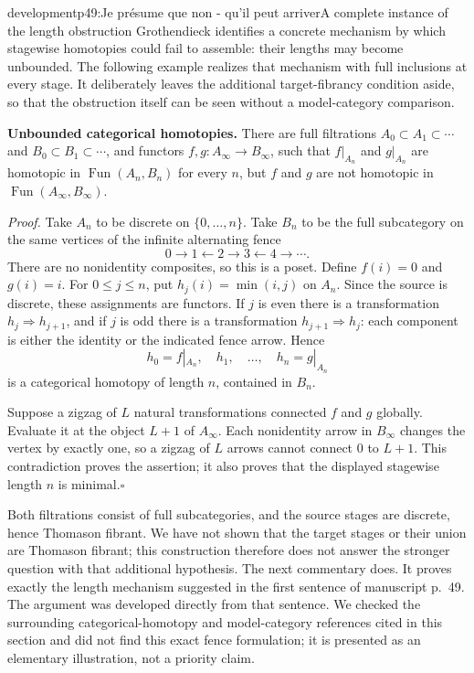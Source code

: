 \begin{dcomment}{development}{p49:Je présume que non - qu'il peut arriver}{A complete instance of the length obstruction}
Grothendieck identifies a concrete mechanism by which stagewise homotopies could fail to assemble: their lengths may become unbounded. The following example realizes that mechanism with full inclusions at every stage. It deliberately leaves the additional target-fibrancy condition aside, so that the obstruction itself can be seen without a model-category comparison.

\textbf{Unbounded categorical homotopies.}\ours\quad
There are full filtrations $A_0\subset A_1\subset\cdots$ and $B_0\subset B_1\subset\cdots$, and functors $f,g:A_\infty\to B_\infty$, such that $f|_{A_n}$ and $g|_{A_n}$ are homotopic in $\operatorname{Fun}(A_n,B_n)$ for every $n$, but $f$ and $g$ are not homotopic in $\operatorname{Fun}(A_\infty,B_\infty)$.

\textit{Proof.} Take $A_n$ to be discrete on $\{0,\ldots,n\}$. Take $B_n$ to be the full subcategory on the same vertices of the infinite alternating fence
\[
 0\longrightarrow1\longleftarrow2\longrightarrow3
       \longleftarrow4\longrightarrow\cdots.
\]
There are no nonidentity composites, so this is a poset. Define $f(i)=0$ and $g(i)=i$. For $0\leq j\leq n$, put $h_j(i)=\min(i,j)$ on $A_n$. Since the source is discrete, these assignments are functors. If $j$ is even there is a transformation $h_j\Rightarrow h_{j+1}$, and if $j$ is odd there is a transformation $h_{j+1}\Rightarrow h_j$: each component is either the identity or the indicated fence arrow. Hence
\[
 h_0=f|_{A_n},\quad h_1,\quad\ldots,\quad h_n=g|_{A_n}
\]
is a categorical homotopy of length $n$, contained in $B_n$.

Suppose a zigzag of $L$ natural transformations connected $f$ and $g$ globally. Evaluate it at the object $L+1$ of $A_\infty$. Each nonidentity arrow in $B_\infty$ changes the vertex by exactly one, so a zigzag of $L$ arrows cannot connect $0$ to $L+1$. This contradiction proves the assertion; it also proves that the displayed stagewise length $n$ is minimal.\hfill$\square$

Both filtrations consist of full subcategories, and the source stages are discrete, hence Thomason fibrant. We have not shown that the target stages or their union are Thomason fibrant; this construction therefore does not answer the stronger question with that additional hypothesis. The next commentary does. It proves exactly the length mechanism suggested in the first sentence of manuscript p.~49. The argument was developed directly from that sentence. We checked the surrounding categorical-homotopy and model-category references cited in this section and did not find this exact fence formulation; it is presented as an elementary illustration, not a priority claim.
\end{dcomment}

